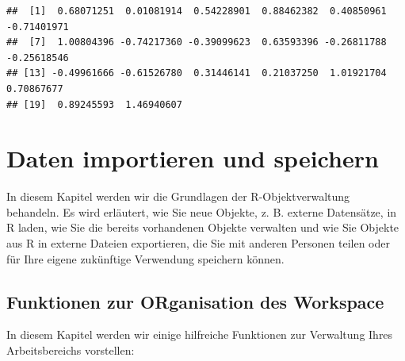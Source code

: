 \documentclass[
]{book}
\begin{document}
\begin{verbatim}
##  [1]  0.68071251  0.01081914  0.54228901  0.88462382  0.40850961 -0.71401971
##  [7]  1.00804396 -0.74217360 -0.39099623  0.63593396 -0.26811788 -0.25618546
## [13] -0.49961666 -0.61526780  0.31446141  0.21037250  1.01921704  0.70867677
## [19]  0.89245593  1.46940607
\end{verbatim}

\hypertarget{daten-importieren-und-speichern}{%
\chapter{Daten importieren und speichern}\label{daten-importieren-und-speichern}}

In diesem Kapitel werden wir die Grundlagen der R-Objektverwaltung behandeln. Es wird erläutert, wie Sie neue Objekte, z. B. externe Datensätze, in R laden, wie Sie die bereits vorhandenen Objekte verwalten und wie Sie Objekte aus R in externe Dateien exportieren, die Sie mit anderen Personen teilen oder für Ihre eigene zukünftige Verwendung speichern können.

\hypertarget{funktionen-zur-organisation-des-workspace}{%
\section{Funktionen zur ORganisation des Workspace}\label{funktionen-zur-organisation-des-workspace}}

In diesem Kapitel werden wir einige hilfreiche Funktionen zur Verwaltung Ihres Arbeitsbereichs vorstellen:
\end{document}
